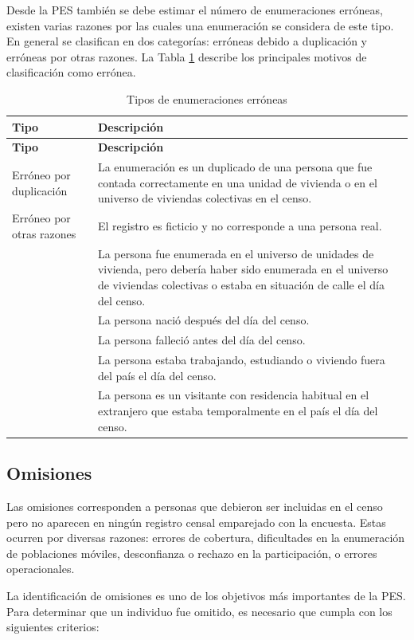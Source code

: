 \documentclass[
  12pt,
]{book}
\begin{document}
Desde la PES también se debe estimar el número de enumeraciones erróneas, existen varias razones por las cuales una enumeración se considera de este tipo. En general se clasifican en dos categorías: erróneas debido a duplicación y erróneas por otras razones. La Tabla \ref{tab:t1} describe los principales motivos de clasificación como errónea.

\begin{longtable}[]{@{}ll@{}}
\caption{\label{tab:t1}Tipos de enumeraciones erróneas}\tabularnewline
\toprule\noalign{}
\textbf{Tipo} & \textbf{Descripción} \\
\midrule\noalign{}
\endfirsthead
\toprule\noalign{}
\textbf{Tipo} & \textbf{Descripción} \\
\midrule\noalign{}
\endhead
\bottomrule\noalign{}
\endlastfoot
Erróneo por duplicación & La enumeración es un duplicado de una persona que fue contada correctamente en una unidad de vivienda o en el universo de viviendas colectivas en el censo. \\
Erróneo por otras razones & El registro es ficticio y no corresponde a una persona real. \\
& La persona fue enumerada en el universo de unidades de vivienda, pero debería haber sido enumerada en el universo de viviendas colectivas o estaba en situación de calle el día del censo. \\
& La persona nació después del día del censo. \\
& La persona falleció antes del día del censo. \\
& La persona estaba trabajando, estudiando o viviendo fuera del país el día del censo. \\
& La persona es un visitante con residencia habitual en el extranjero que estaba temporalmente en el país el día del censo. \\
\end{longtable}

\subsection{Omisiones}\label{omisiones}

Las omisiones corresponden a personas que debieron ser incluidas en el censo pero no aparecen en ningún registro censal emparejado con la encuesta. Estas ocurren por diversas razones: errores de cobertura, dificultades en la enumeración de poblaciones móviles, desconfianza o rechazo en la participación, o errores operacionales.

La identificación de omisiones es uno de los objetivos más importantes de la PES. Para determinar que un individuo fue omitido, es necesario que cumpla con los siguientes criterios:
\end{document}
